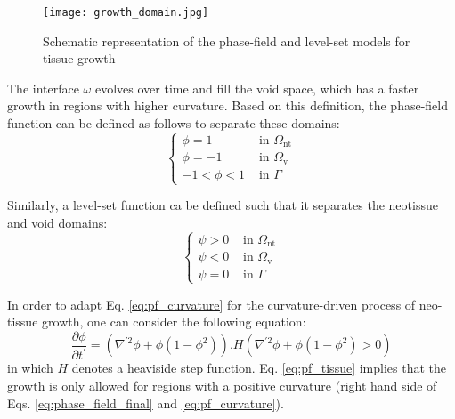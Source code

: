 \begin{figure}
\medskip
\centering
\texttt{[image: growth\_domain.jpg]}
\caption[Schematic representation of the phase-field and level-set models for tissue growth]{Schematic representation of the phase-field and level-set models for tissue growth}
\label{fig:growth_domain}
\end{figure}

The interface $\omega$ evolves over time and fill the void space, which has a faster growth in regions with higher curvature. Based on this definition, the phase-field function can be defined as follows to separate these domains:
\begin{equation} \label{eq:pf_domains}
\left\{\begin{array}{ll}
\phi = 1 & \text{ in } \Omega_{\text{nt}} \\
\phi = -1 & \text{ in } \Omega_{\text{v}} \\
-1 < \phi < 1 & \text{ in } \Gamma
\end{array}\right.
\end{equation}

Similarly, a level-set function ca be defined such that it separates the neotissue and void domains:
\begin{equation} \label{eq:ls_domains}
\left\{\begin{array}{ll}
\psi > 0 & \text{ in } \Omega_{\text{nt}} \\
\psi < 0 & \text{ in } \Omega_{\text{v}} \\
\psi = 0 & \text{ in } \Gamma
\end{array}\right.
\end{equation}

In order to adapt Eq. \ref{eq:pf_curvature} for the curvature-driven process of neo-tissue growth, one can consider the following equation:
\begin{equation} \label{eq:pf_tissue}
\frac{\partial \phi}{\partial t^{\prime}}=\left(\nabla^{\prime 2} \phi+\phi\left(1-\phi^{2}\right)\right).H\left(\nabla^{\prime 2} \phi+\phi\left(1-\phi^{2}\right)>0\right)
\end{equation}
in which $H$ denotes a heaviside step function. Eq. \ref{eq:pf_tissue} implies that the growth is only allowed for regions with a positive curvature (right hand side of Eqs. \ref{eq:phase_field_final} and \ref{eq:pf_curvature}).

